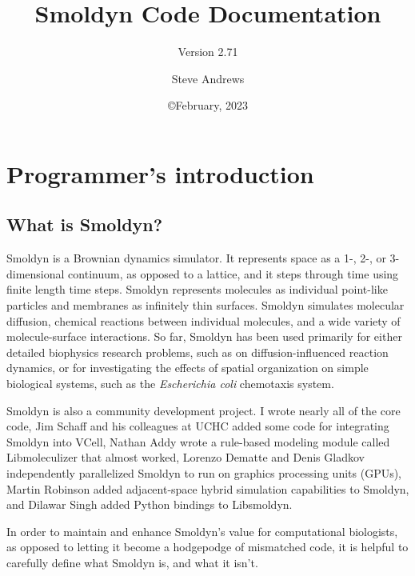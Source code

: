 \documentclass {scrbook}
\begin{document}

\title{Smoldyn Code Documentation} 
\subtitle{Version 2.71}
\date{\copyright February, 2023}
\author{Steve Andrews}
\maketitle

\tableofcontents


\chapter{Programmer's introduction}

\section{What is Smoldyn?}

Smoldyn is a Brownian dynamics simulator. It represents space as a 1-, 2-, or 3-dimensional continuum, as opposed to a lattice, and it steps through time using finite length time steps. Smoldyn represents molecules as individual point-like particles and membranes as infinitely thin surfaces. Smoldyn simulates molecular diffusion, chemical reactions between individual molecules, and a wide variety of molecule-surface interactions. So far, Smoldyn has been used primarily for either detailed biophysics research problems, such as on diffusion-influenced reaction dynamics, or for investigating the effects of spatial organization on simple biological systems, such as the \emph{Escherichia coli} chemotaxis system.

Smoldyn is also a community development project. I wrote nearly all of the core code, Jim Schaff and his colleagues at UCHC added some code for integrating Smoldyn into VCell, Nathan Addy wrote a rule-based modeling module called Libmoleculizer that almost worked, Lorenzo Dematte and Denis Gladkov independently parallelized Smoldyn to run on graphics processing units (GPUs), Martin Robinson added adjacent-space hybrid simulation capabilities to Smoldyn, and Dilawar Singh added Python bindings to Libsmoldyn.

In order to maintain and enhance Smoldyn's value for computational biologists, as opposed to letting it become a hodgepodge of mismatched code, it is helpful to carefully define what Smoldyn is, and what it isn't.
\end{document}
